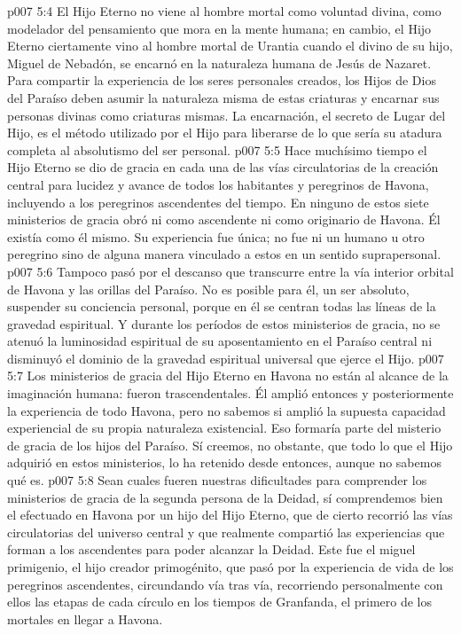\vs p007 5:4 El Hijo Eterno no viene al hombre mortal como voluntad divina, como modelador del pensamiento que mora en la mente humana; en cambio, el Hijo Eterno ciertamente vino al hombre mortal de Urantia cuando el  divino de su hijo, Miguel de Nebadón, se encarnó en la naturaleza humana de Jesús de Nazaret. Para compartir la experiencia de los seres personales creados, los Hijos de Dios del Paraíso deben asumir la naturaleza misma de estas criaturas y encarnar sus personas divinas como criaturas mismas. La encarnación, el secreto de Lugar del Hijo, es el método utilizado por el Hijo para liberarse de lo que sería su atadura completa al absolutismo del ser personal.
\vs p007 5:5 \pc Hace muchísimo tiempo el Hijo Eterno se dio de gracia en cada una de las vías circulatorias de la creación central para lucidez y avance de todos los habitantes y peregrinos de Havona, incluyendo a los peregrinos ascendentes del tiempo. En ninguno de estos siete ministerios de gracia obró ni como ascendente ni como originario de Havona. Él existía como él mismo. Su experiencia fue única; no fue  ni  un humano u otro peregrino sino de alguna manera vinculado a estos en un sentido suprapersonal.
\vs p007 5:6 Tampoco pasó por el descanso que transcurre entre la vía interior orbital de Havona y las orillas del Paraíso. No es posible para él, un ser absoluto, suspender su conciencia personal, porque en él se centran todas las líneas de la gravedad espiritual. Y durante los períodos de estos ministerios de gracia, no se atenuó la luminosidad espiritual de su aposentamiento en el Paraíso central ni disminuyó el dominio de la gravedad espiritual universal que ejerce el Hijo.
\vs p007 5:7 \pc Los ministerios de gracia del Hijo Eterno en Havona no están al alcance de la imaginación humana: fueron trascendentales. Él amplió entonces y posteriormente la experiencia de todo Havona, pero no sabemos si amplió la supuesta capacidad experiencial de su propia naturaleza existencial. Eso formaría parte del misterio de gracia de los hijos del Paraíso. Sí creemos, no obstante, que todo lo que el Hijo adquirió en estos ministerios, lo ha retenido desde entonces, aunque no sabemos qué es.
\vs p007 5:8 \pc Sean cuales fueren nuestras dificultades para comprender los ministerios de gracia de la segunda persona de la Deidad, sí comprendemos bien el efectuado en Havona por un hijo del Hijo Eterno, que de cierto recorrió las vías circulatorias del universo central y que realmente compartió las experiencias que forman a los ascendentes para poder alcanzar la Deidad. Este fue el miguel primigenio, el hijo creador primogénito, que pasó por la experiencia de vida de los peregrinos ascendentes, circundando vía tras vía, recorriendo personalmente con ellos las etapas de cada círculo en los tiempos de Granfanda, el primero de los mortales en llegar a Havona.

